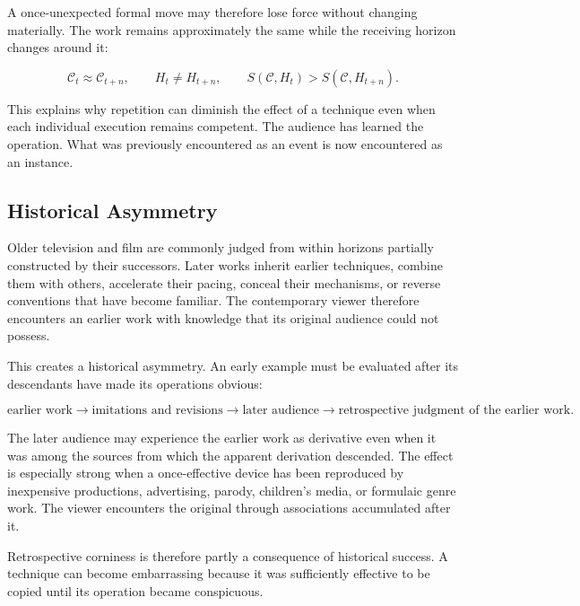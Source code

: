 \documentclass[11pt]{article}
\newcommand{\contentobj}{\mathcal{C}}
\begin{document}
A once-unexpected formal move may therefore lose force without changing
materially. The work remains approximately the same while the receiving
horizon changes around it:

\begin{equation}
  \contentobj_t \approx \contentobj_{t+n},
  \qquad
  H_t \neq H_{t+n},
  \qquad
  S(\contentobj,H_t) > S(\contentobj,H_{t+n}).
  \label{eq:historical-surprise}
\end{equation}

This explains why repetition can diminish the effect of a technique even when
each individual execution remains competent. The audience has learned the
operation. What was previously encountered as an event is now encountered as
an instance.

\subsection{Historical Asymmetry}

Older television and film are commonly judged from within horizons partially
constructed by their successors. Later works inherit earlier techniques,
combine them with others, accelerate their pacing, conceal their mechanisms,
or reverse conventions that have become familiar. The contemporary viewer
therefore encounters an earlier work with knowledge that its original
audience could not possess.

This creates a historical asymmetry. An early example must be evaluated after
its descendants have made its operations obvious:

\begin{equation}
  \text{earlier work}
  \longrightarrow
  \text{imitations and revisions}
  \longrightarrow
  \text{later audience}
  \longrightarrow
  \text{retrospective judgment of the earlier work}.
  \label{eq:historical-asymmetry}
\end{equation}

The later audience may experience the earlier work as derivative even when it
was among the sources from which the apparent derivation descended. The
effect is especially strong when a once-effective device has been reproduced
by inexpensive productions, advertising, parody, children's media, or
formulaic genre work. The viewer encounters the original through associations
accumulated after it.

Retrospective corniness is therefore partly a consequence of historical
success. A technique can become embarrassing because it was sufficiently
effective to be copied until its operation became conspicuous.
\end{document}

